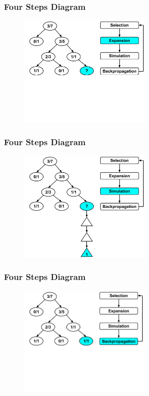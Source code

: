 \documentclass{beamer}
\begin{document}
\begin{frame}[fragile]
\frametitle{Four Steps Diagram}
\begin{figure}[h]
	\includegraphics[width=6.5cm]{Diagrams/MCTSShort/MCTSShortTwoTwo.pdf}
	\centering
\end{figure}
\end{frame}

\begin{frame}[fragile]
\frametitle{Four Steps Diagram}
\begin{figure}[h]
	\includegraphics[width=6.5cm]{Diagrams/MCTSShort/MCTSShortTwoThree.pdf}
	\centering
\end{figure}
\end{frame}

\begin{frame}[fragile]
\frametitle{Four Steps Diagram}
\begin{figure}[h]
	\includegraphics[width=6.5cm]{Diagrams/MCTSShort/MCTSShortTwoFourOne.pdf}
	\centering
\end{figure}
\end{frame}
\end{document}
